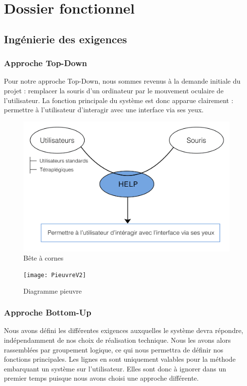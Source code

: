 \chapter{Dossier fonctionnel}
\section{Ingénierie des exigences}
\subsection{Approche Top-Down}
\label{sec:top-down}

Pour notre approche Top-Down, nous sommes revenus à la demande initiale du projet : remplacer la souris d'un ordinateur par le mouvement oculaire de l'utilisateur. La fonction principale du système est donc apparue clairement : permettre à l'utilisateur d'interagir avec une interface via ses yeux. 

\begin{figure}[h]
  \centering
  \includegraphics[scale=1]{BeteACornes}
  \caption{Bête à cornes}
  \label{fig:bac}
\end{figure}

\begin{figure}[H]
  \centering
  \texttt{[image: PieuvreV2]}
  \caption{Diagramme pieuvre}
  \label{fig:pieuvre}
\end{figure}

\subsection{Approche Bottom-Up}
Nous avons défini les différentes exigences auxquelles le système devra répondre, indépendamment de nos choix de réalisation technique. Nous les avons alors rassemblées par groupement logique, ce qui nous permettra de définir nos fonctions principales. Les lignes en {\color{sable}{\rule{0.5cm}{0.25cm}}} sont uniquement valables pour la méthode embarquant un système sur l'utilisateur. Elles sont donc à ignorer dans un premier temps puisque nous avons choisi une approche différente. 

